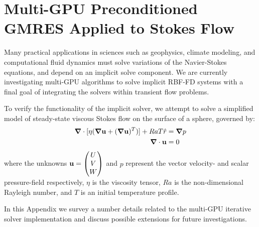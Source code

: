 
\chapter{Multi-GPU Preconditioned GMRES Applied to Stokes Flow}
\label{app:implicit_solver}

Many practical applications in sciences such as geophysics, climate modeling, and computational fluid dynamics must solve variations of the Navier-Stokes equations, and depend on an implicit solve component. We are currently investigating multi-GPU algorithms to solve implicit RBF-FD systems with a final goal of integrating the solvers within transient flow problems.

To verify the functionality of the implicit solver, we attempt to solve a simplified model of steady-state viscous Stokes flow on the surface of a sphere, governed by: 
  \begin{align}
\mbox{\boldmath$ \nabla $} \cdot [\eta(\mbox{\boldmath$ \nabla $} \mathbf{u} + (\mbox{\boldmath$ \nabla $} \mathbf{u})^T)] + Ra T \hat{r} & = \mbox{\boldmath$ \nabla $} p \label{eq:stokes_momentum} \\
\mbox{\boldmath$ \nabla $} \cdot \mathbf{u} & = 0 \label{eq:stokes_continuity} 
\end{align}
where the unknowns $\mathbf{u} = \begin{pmatrix} U \\ V \\ W\end{pmatrix}$ and $p$ represent the vector velocity- and scalar pressure-field respectively, $\eta$ is the viscosity tensor, $Ra$ is the non-dimensional Rayleigh number, and $T$ is an initial temperature profile. 

In this Appendix we survey a number details related to the multi-GPU iterative solver implementation and discuss possible extensions for future investigations. 





